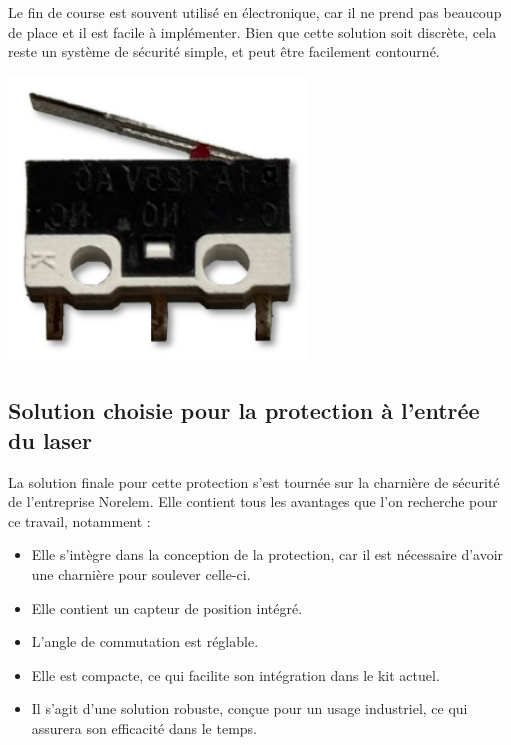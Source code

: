 \begin{minipage}[c]{0.6\textwidth}
    Le fin de course est souvent utilisé en électronique, car il ne prend pas beaucoup de place et il est facile à implémenter. Bien que cette solution soit discrète, cela reste un système de sécurité simple, et peut être facilement contourné.

\end{minipage}\hfill
\begin{minipage}[c]{0.35\textwidth}
    \begin{center}
        \includegraphics[width=0.6\textwidth]{assets/figures/Protections_laser/Securite_electrique/fin_de_course.png}
    \end{center}
    \label{fin_de_course}
\end{minipage}

\newpage
\subsection{Solution choisie pour la protection à l'entrée du laser}
La solution finale pour cette protection s'est tournée sur la charnière de sécurité de l'entreprise Norelem. Elle contient tous les avantages que l'on recherche pour ce travail, notamment :
\begin{itemize}[label=\textbullet]
    \item Elle s'intègre dans la conception de la protection, car il est nécessaire d'avoir une charnière pour soulever celle-ci.
    \item Elle contient un capteur de position intégré.
    \item L'angle de commutation est réglable.
    \item Elle est compacte, ce qui facilite son intégration dans le kit actuel.
    \item Il s'agit d'une solution robuste, conçue pour un usage industriel, ce qui assurera son efficacité dans le temps.
\end{itemize}

